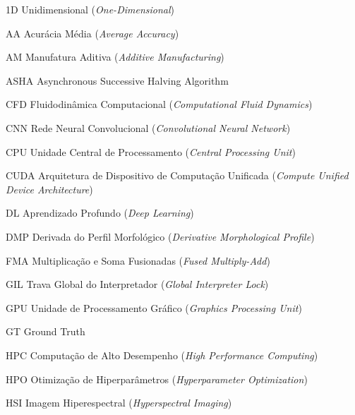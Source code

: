 \listoffigures*
\cleardoublepage

\listoftables*
\cleardoublepage

\listofquadros*
\cleardoublepage
\listofequacao*
\cleardoublepage

\begin{siglas}
    \item[1D]    Unidimensional (\textit{One-Dimensional})
    \item[AA]    Acurácia Média (\textit{Average Accuracy})
    \item[AM]    Manufatura Aditiva (\textit{Additive Manufacturing})
    \item[ASHA]  Asynchronous Successive Halving Algorithm
    \item[CFD]   Fluidodinâmica Computacional (\textit{Computational Fluid Dynamics})
    \item[CNN]   Rede Neural Convolucional (\textit{Convolutional Neural Network})
    \item[CPU]   Unidade Central de Processamento (\textit{Central Processing Unit})
    \item[CUDA]  Arquitetura de Dispositivo de Computação Unificada (\textit{Compute Unified Device Architecture})
    \item[DL]    Aprendizado Profundo (\textit{Deep Learning})
    \item[DMP]   Derivada do Perfil Morfológico (\textit{Derivative Morphological Profile})
    \item[FMA]   Multiplicação e Soma Fusionadas (\textit{Fused Multiply-Add})
    \item[GIL]   Trava Global do Interpretador (\textit{Global Interpreter Lock})
    \item[GPU]   Unidade de Processamento Gráfico (\textit{Graphics Processing Unit})
    \item[GT]    Ground Truth
    \item[HPC]   Computação de Alto Desempenho (\textit{High Performance Computing})
    \item[HPO]   Otimização de Hiperparâmetros (\textit{Hyperparameter Optimization})
    \item[HSI]   Imagem Hiperespectral (\textit{Hyperspectral Imaging})

\end{siglas}
